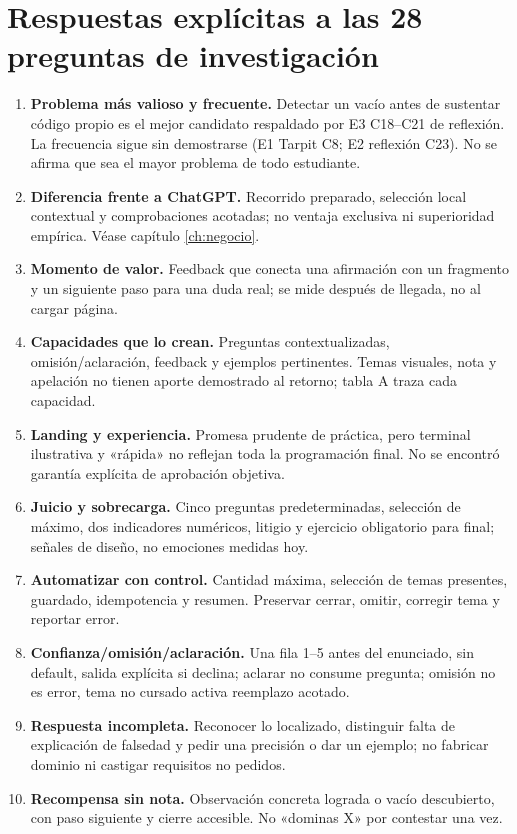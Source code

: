 \documentclass[11pt,a4paper]{report}
\begin{document}
\chapter{Respuestas explícitas a las 28 preguntas de investigación}
\label{ap:preguntas}
\begin{enumerate}
\item \textbf{Problema más valioso y frecuente.} Detectar un vacío antes de sustentar código propio es el mejor candidato respaldado por E3 C18--C21 de reflexión. La frecuencia sigue sin demostrarse (E1 Tarpit C8; E2 reflexión C23). No se afirma que sea el mayor problema de todo estudiante.
\item \textbf{Diferencia frente a ChatGPT.} Recorrido preparado, selección local contextual y comprobaciones acotadas; no ventaja exclusiva ni superioridad empírica. Véase capítulo \ref{ch:negocio}.
\item \textbf{Momento de valor.} Feedback que conecta una afirmación con un fragmento y un siguiente paso para una duda real; se mide después de llegada, no al cargar página.
\item \textbf{Capacidades que lo crean.} Preguntas contextualizadas, omisión/aclaración, feedback y ejemplos pertinentes. Temas visuales, nota y apelación no tienen aporte demostrado al retorno; tabla A traza cada capacidad.
\item \textbf{Landing y experiencia.} Promesa prudente de práctica, pero terminal ilustrativa y «rápida» no reflejan toda la programación final. No se encontró garantía explícita de aprobación objetiva.
\item \textbf{Juicio y sobrecarga.} Cinco preguntas predeterminadas, selección de máximo, dos indicadores numéricos, litigio y ejercicio obligatorio para final; señales de diseño, no emociones medidas hoy.
\item \textbf{Automatizar con control.} Cantidad máxima, selección de temas presentes, guardado, idempotencia y resumen. Preservar cerrar, omitir, corregir tema y reportar error.
\item \textbf{Confianza/omisión/aclaración.} Una fila 1--5 antes del enunciado, sin default, salida explícita si declina; aclarar no consume pregunta; omisión no es error, tema no cursado activa reemplazo acotado.
\item \textbf{Respuesta incompleta.} Reconocer lo localizado, distinguir falta de explicación de falsedad y pedir una precisión o dar un ejemplo; no fabricar dominio ni castigar requisitos no pedidos.
\item \textbf{Recompensa sin nota.} Observación concreta lograda o vacío descubierto, con paso siguiente y cierre accesible. No «dominas X» por contestar una vez.

\end{enumerate}
\end{document}

